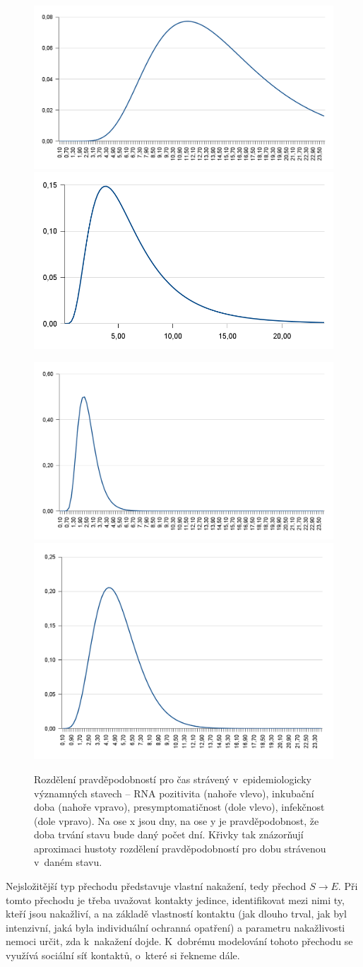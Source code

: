 \begin{figure}%
\centerline{%
\includegraphics[width=0.49\columnwidth]{pic/time-rna}%
\includegraphics[width=0.49\columnwidth]{pic/time-ink}}
\centerline{%
\includegraphics[width=0.49\columnwidth]{pic/time-pre}%
\includegraphics[width=0.49\columnwidth]{pic/time-inf}%
}
\caption{Rozdělení pravděpodobností pro čas strávený v~epidemiologicky významných stavech -- RNA pozitivita (nahoře vlevo), inkubační doba (nahoře vpravo), presymptomatičnost (dole vlevo), infekčnost (dole vpravo). Na ose x jsou dny, na ose y je pravděpodobnost, že doba trvání stavu bude daný počet dní. Křivky tak znázorňují aproximaci hustoty rozdělení pravděpodobností pro dobu strávenou v~daném stavu.}%
\label{fig:times-states}%
\end{figure}

Nejsložitější typ přechodu představuje vlastní nakažení, tedy přechod $S\to E$. Při tomto přechodu je třeba uvažovat kontakty jedince, identifikovat mezi nimi ty, kteří jsou nakažliví, a na základě vlastností kontaktu (jak dlouho trval, jak byl intenzivní, jaká byla individuální ochranná opatření) a parametru nakažlivosti nemoci určit, zda k~nakažení dojde. K~dobrému modelování tohoto přechodu se využívá sociální síť kontaktů, o~které si řekneme dále. 

